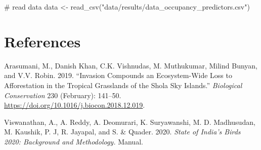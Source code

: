 \documentclass[]{article}
\newenvironment{Shaded}{}{}
\newcommand{\CommentTok}[1]{\textcolor[rgb]{0.00,0.50,0.00}{#1}}
\newcommand{\DataTypeTok}[1]{#1}
\newcommand{\KeywordTok}[1]{\textcolor[rgb]{0.00,0.00,1.00}{#1}}
\newcommand{\NormalTok}[1]{#1}
\newcommand{\OperatorTok}[1]{#1}
\newcommand{\StringTok}[1]{\textcolor[rgb]{0.00,0.50,0.50}{#1}}
\begin{document}
\begin{Shaded}
\begin{Highlighting}[numbers=left,,]
\CommentTok{# read data}
\NormalTok{data <-}\StringTok{ }\KeywordTok{read_csv}\NormalTok{(}\StringTok{"data/results/data_occupancy_predictors.csv"}\NormalTok{)}
\end{Highlighting}
\end{Shaded}

\begin{Shaded}
\end{Shaded}

\clearpage

\hypertarget{references}{%
\section{References}\label{references}}

\hypertarget{refs}{}
\leavevmode\hypertarget{ref-arasumani2019}{}%
Arasumani, M., Danish Khan, C.K. Vishnudas, M. Muthukumar, Milind Bunyan, and V.V. Robin. 2019. ``Invasion Compounds an Ecosystem-Wide Loss to Afforestation in the Tropical Grasslands of the Shola Sky Islands.'' \emph{Biological Conservation} 230 (February): 141--50. \url{https://doi.org/10.1016/j.biocon.2018.12.019}.

\leavevmode\hypertarget{ref-viswanathan2020}{}%
Viswanathan, A., A. Reddy, A. Deomurari, K. Suryawanshi, M. D. Madhusudan, M. Kaushik, P. J, R. Jayapal, and S. \& Quader. 2020. \emph{State of India's Birds 2020: Background and Methodology.} Manual.
\end{document}
